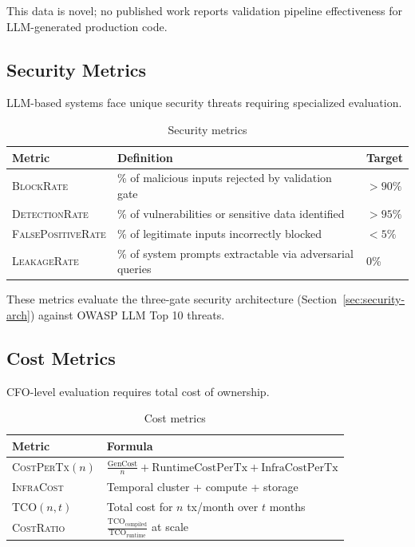 \documentclass[11pt]{article}
\newcommand{\metric}[1]{\textsc{#1}}
\begin{document}
This data is novel; no published work reports validation pipeline effectiveness for LLM-generated production code.

\subsection{Security Metrics}

LLM-based systems face unique security threats requiring specialized evaluation.

\begin{table}[ht]
\centering
\caption{Security metrics}
\label{tab:security-metrics}
\begin{tabular}{p{3.5cm}p{5cm}p{3.5cm}}
\toprule
Metric & Definition & Target \\
\midrule
\metric{BlockRate} & \% of malicious inputs rejected by validation gate & $> 90\%$ \\
\metric{DetectionRate} & \% of vulnerabilities or sensitive data identified & $> 95\%$ \\
\metric{FalsePositiveRate} & \% of legitimate inputs incorrectly blocked & $< 5\%$ \\
\metric{LeakageRate} & \% of system prompts extractable via adversarial queries & 0\% \\
\bottomrule
\end{tabular}
\end{table}

These metrics evaluate the three-gate security architecture (Section~\ref{sec:security-arch}) against OWASP LLM Top 10 threats.

\subsection{Cost Metrics}

CFO-level evaluation requires total cost of ownership.

\begin{table}[ht]
\centering
\caption{Cost metrics}
\label{tab:cost-metrics}
\begin{tabular}{p{3.5cm}p{8.5cm}}
\toprule
Metric & Formula \\
\midrule
\metric{CostPerTx}$(n)$ & $\frac{\text{GenCost}}{n} + \text{RuntimeCostPerTx} + \text{InfraCostPerTx}$ \\
\metric{InfraCost} & Temporal cluster + compute + storage \\
\metric{TCO}$(n, t)$ & Total cost for $n$ tx/month over $t$ months \\
\metric{CostRatio} & $\frac{\text{TCO}_{\text{compiled}}}{\text{TCO}_{\text{runtime}}}$ at scale \\
\bottomrule
\end{tabular}
\end{table}
\end{document}
